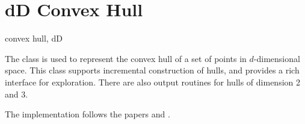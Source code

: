 \section{dD Convex Hull}
\begin{ccPackage}{convex hull, dD}
  
  The class  is used to represent the
  convex hull of a set of points in $d$-dimensional space.  This class
  supports incremental construction of hulls, and provides a rich
  interface for exploration. There are also output routines for hulls
  of dimension 2 and 3.
  
  The implementation follows the papers \cite{cms:fourresults-93} and
  \cite{BMS:degeneracy-94}.

\end{ccPackage}

